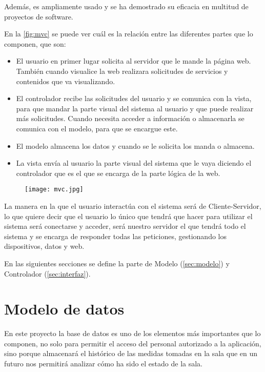 Además, es ampliamente usado y se ha demostrado su eficacia en multitud de proyectos de software.
\pagebreak

En la \autoref{fig:mvc} se puede ver cuál es la relación entre las diferentes partes que lo componen, que son:
\begin{itemize}
    \item El usuario en primer lugar solicita al servidor que le mande la página web. También cuando visualice la web realizara solicitudes de servicios y contenidos que va visualizando.
    \item El controlador recibe las solicitudes del usuario y se comunica con la vista, para que mandar la parte visual del sistema al usuario y que puede realizar más solicitudes. Cuando necesita acceder a información o almacenarla se comunica con el modelo, para que se encargue este.
    \item El modelo almacena los datos y cuando se le solicita los manda o almacena.
    \item La vista envía al usuario la parte visual del sistema que le vaya diciendo el controlador que es el que se encarga de la parte lógica de la web.
\end{itemize}

\begin{figure}[H]
	{\texttt{[image: mvc.jpg]}}
\end{figure}

La manera en la que el usuario interactúa con el sistema será de Cliente-Servidor, lo que quiere decir que el usuario lo único que tendrá que hacer para utilizar el sistema será conectarse y acceder, será nuestro servidor el que tendrá todo el sistema y se encarga de responder todas las peticiones, gestionando los dispositivos, datos y web. 

En las siguientes secciones se define la parte de Modelo (\autoref{sec:modelo}) y Controlador (\autoref{sec:interfaz}).
\pagebreak

\section{Modelo de datos}\label{sec:modelo}
En este proyecto la base de datos es uno de los elementos más importantes que lo componen, no solo para permitir el acceso del personal autorizado a la aplicación, sino porque almacenará el histórico de las medidas tomadas en la sala que en un futuro nos permitirá analizar cómo ha sido el estado de la sala.

